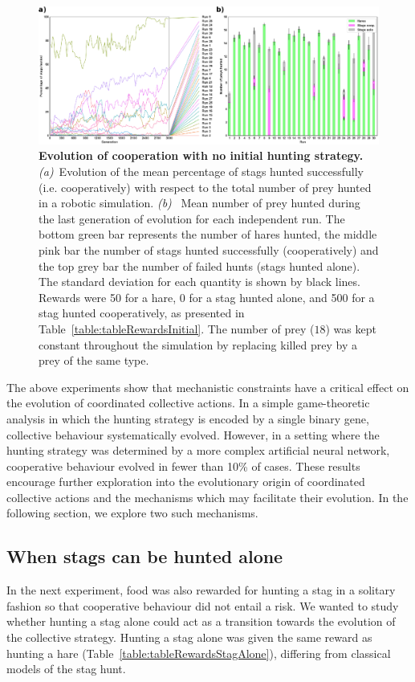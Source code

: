     \begin{figure}[h]
      \centerfloat
        \includegraphics[scale = 0.90]{fig/ArticleBio1/Fig5.eps}
      \caption{\textbf{Evolution of cooperation with no initial hunting strategy.} 
      {\em (a)}~Evolution of the mean percentage of stags hunted successfully (i.e. cooperatively) with respect to the total number of prey hunted in a robotic simulation. {\em (b)}~ Mean number of prey hunted during the last generation of evolution for each independent run. The bottom green bar represents the number of hares hunted, the middle pink bar the number of stags hunted successfully (cooperatively) and the top grey bar the number of failed hunts (stags hunted alone). The standard deviation for each quantity is shown by black lines. Rewards were 50 for a hare, 0 for a stag hunted alone, and 500 for a stag hunted cooperatively, as presented in Table~\ref{table:tableRewardsInitial}. The number of prey ($18$) was kept constant throughout the simulation by replacing killed prey by a prey of the same type.}
      \label{fig:initialRandom}
    \end{figure}

    The above experiments show that mechanistic constraints have a critical effect on the evolution of coordinated collective actions. In a simple game-theoretic analysis in which the hunting strategy is encoded by a single binary gene, collective behaviour systematically evolved. However, in a setting where the hunting strategy was determined by a more complex artificial neural network, cooperative behaviour evolved in fewer than 10\% of cases. These results encourage further exploration into the evolutionary origin of coordinated collective actions and the mechanisms which may facilitate their evolution. In the following section, we explore two such mechanisms.


  \subsection{When stags can be hunted alone}
  \label{successfulCooperation}
    In the next experiment, food was also rewarded for hunting a stag in a solitary fashion so that cooperative behaviour did not entail a risk. We wanted to study whether hunting a stag alone could act as a transition towards the evolution of the collective strategy. Hunting a stag alone was given the same reward as hunting a hare (Table~\ref{table:tableRewardsStagAlone}), differing from classical models of the stag hunt.

